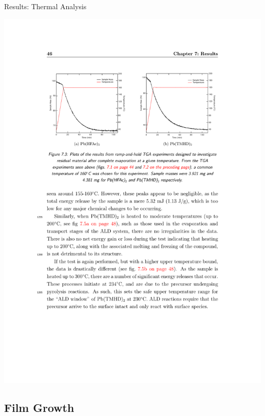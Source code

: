 \documentclass[professionalfont]{beamer}
\begin{document}
\begin{frame}{Results: Thermal Analysis}
\begin{overprint}
\begin{center}
		\centerline{\includegraphics[width=\textwidth]{./graphics/data/tga/hold}}
		\end{center}		
\end{overprint}
\end{frame}

\subsection{Film Growth}
\end{document}
